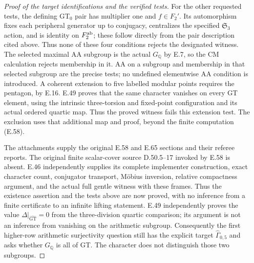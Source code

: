 \begin{proof}[Proof of the target identifications and the verified tests]
For the other requested tests, the defining
GT$_0$ pair has multiplier one and $f\in F_2'$.
Its automorphism fixes each peripheral generator
up to conjugacy, centralizes the specified
$\mathfrak S_3$ action, and is identity on
$F_2^{\rm ab}$; these follow directly from the
pair description cited above.  Thus none of these
four conditions rejects the designated witness.
The selected maximal AA subgroup is the actual
$G_{\mathbb Q}$ by E.7, so the CM calculation
rejects membership in it.  AA on a subgroup and
membership in that selected subgroup are the
precise tests; no undefined elementwise AA
condition is introduced.  A coherent extension
to five labelled modular points requires the
pentagon, by E.16. E.49 proves that the same
character vanishes on every GT element, using
the intrinsic three-torsion and fixed-point
configuration and its actual ordered quartic
map. Thus the proved witness fails this extension
test. The exclusion uses that additional map
and proof, beyond the finite computation (E.58).

The attachments supply the original E.58 and E.65
sections and their referee reports. The original
finite scalar-cover source D.50.5--17 invoked by
E.58 is absent. E.46 independently supplies its
complete implementer construction, exact character
count, conjugator transport, M\"obius inversion,
relative compactness argument, and the actual full
gentle witness with these frames. Thus the
existence assertion and the tests above are now
proved, with no inference from a finite certificate
to an infinite lifting statement.
E.49 independently proves the value
$\Delta|_{\widehat{\operatorname{GT}}}=0$ from the
three-division quartic comparison; its argument
is not an inference from vanishing on the
arithmetic subgroup. Consequently the first
higher-row arithmetic surjectivity question
still has the explicit target
$\widehat\Gamma_{0,5}$ and asks whether
$G_{\mathbb Q}$ is all of GT. The character
does not distinguish those two subgroups.
\end{proof}

